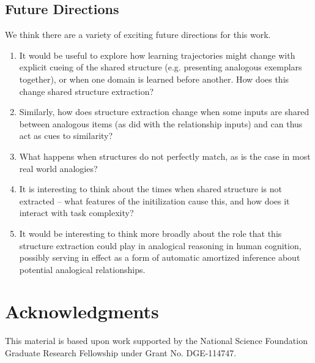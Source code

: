 \documentclass[10pt,letterpaper]{article}
\begin{document}
\subsection{Future Directions}
We think there are a variety of exciting future directions for this work. 
\begin{enumerate}
\item It would be useful to explore how learning trajectories might change with explicit cueing of the shared structure (e.g. presenting analogous exemplars together), or when one domain is learned before another. How does this change shared structure extraction?
\item Similarly, how does structure extraction change when some inputs are shared between analogous items (as \citet{Hinton1986} did with the relationship inputs) and can thus act as cues to similarity?
\item What happens when structures do not perfectly match, as is the case in most real world analogies?
\item It is interesting to think about the times when shared structure is not extracted -- what features of the initilization cause this, and how does it interact with task complexity?
\item It would be interesting to think more broadly about the role that this structure extraction could play in analogical reasoning in human cognition, possibly serving in effect as a form of automatic amortized inference about potential analogical relationships.
\end{enumerate}
\section{Acknowledgments}
This material is based upon work supported by the National Science Foundation Graduate Research Fellowship under Grant No. DGE-114747.


\setlength{\bibleftmargin}{.125in}
\setlength{\bibindent}{-\bibleftmargin}


\end{document}
